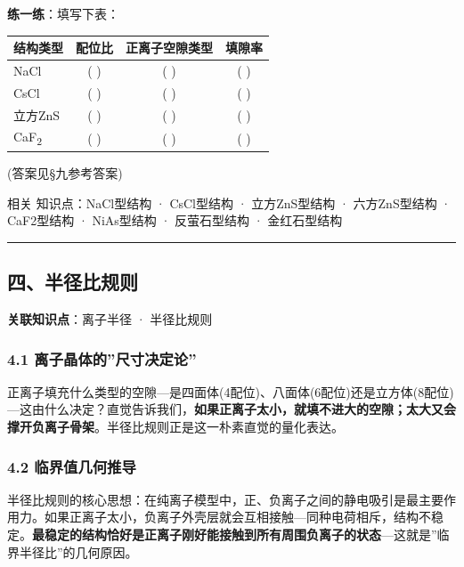 \textbf{练一练}：填写下表：

{\def\LTcaptype{none} %
\begin{longtable}[]{@{}lccc@{}}
\toprule\noalign{}
结构类型 & 配位比 & 正离子空隙类型 & 填隙率 \\
\midrule\noalign{}
\endhead
\bottomrule\noalign{}
\endlastfoot
NaCl & ( ) & ( ) & ( ) \\
CsCl & ( ) & ( ) & ( ) \\
立方ZnS & ( ) & ( ) & ( ) \\
CaF\textsubscript{2} & ( ) & ( ) & ( ) \\
\end{longtable}
}

(答案见§九参考答案)

相关 知识点：NaCl型结构 · CsCl型结构 · 立方ZnS型结构 · 六方ZnS型结构 · CaF2型结构 · NiAs型结构 · 反萤石型结构 · 金红石型结构

\begin{center}\rule{0.5\linewidth}{0.5pt}\end{center}

\subsection{四、半径比规则}\label{ux56dbux534aux5f84ux6bd4ux89c4ux5219}

\textbf{关联知识点}：离子半径 · 半径比规则

\subsubsection{4.1 离子晶体的''尺寸决定论''}\label{ux79bbux5b50ux6676ux4f53ux7684ux5c3aux5bf8ux51b3ux5b9aux8bba}

正离子填充什么类型的空隙---是四面体(4配位)、八面体(6配位)还是立方体(8配位)---这由什么决定？直觉告诉我们，\textbf{如果正离子太小，就填不进大的空隙；太大又会撑开负离子骨架}。半径比规则正是这一朴素直觉的量化表达。

\subsubsection{4.2 临界值几何推导}\label{ux4e34ux754cux503cux51e0ux4f55ux63a8ux5bfc}

半径比规则的核心思想：在纯离子模型中，正、负离子之间的静电吸引是最主要作用力。如果正离子太小，负离子外壳层就会互相接触---同种电荷相斥，结构不稳定。\textbf{最稳定的结构恰好是正离子刚好能接触到所有周围负离子的状态}---这就是''临界半径比''的几何原因。

